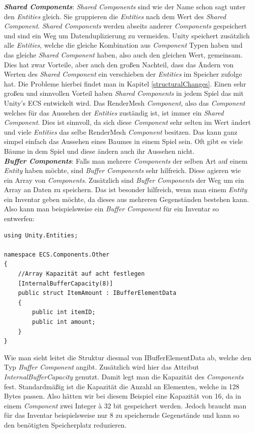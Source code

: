 \textbf{\textit{Shared Components}}: \textit{Shared Components} sind wie der Name schon sagt unter den \textit{Entities} gleich. Sie gruppieren die \textit{Entities} nach dem Wert des \textit{Shared Component}. \textit{Shared Components} werden abseits anderer \textit{Components} gespeichert und sind ein Weg um Datenduplizierung zu vermeiden. Unity speichert zusätzlich alle \textit{Entities}, welche die gleiche Kombination aus \textit{Component} Typen haben und das gleiche \textit{Shared Component} haben, also auch den gleichen Wert, gemeinsam. Dies hat zwar Vorteile, aber auch den großen Nachteil, dass das Ändern von Werten des \textit{Shared Component} ein verschieben der \textit{Entities} im Speicher zufolge hat. Die Probleme hierbei findet man in Kapitel \ref{structuralChanges}. Einen sehr großen und sinnvollen Vorteil haben \textit{Shared Components} in jedem Spiel das mit Unity's ECS entwickelt wird. Das RenderMesh \textit{Component}, also das \textit{Component} welches für das Aussehen der \textit{Entities} zuständig ist, ist immer ein \textit{Shared Component}. Dies ist sinnvoll, da sich diese \textit{Component} sehr selten im Wert ändert und viele \textit{Entities} das selbe RenderMesh \textit{Component} besitzen. Das kann ganz simpel einfach das Aussehen eines Baumes in einem Spiel sein. Oft gibt es viele Bäume in dem Spiel und diese ändern auch ihr Aussehen nicht.\\
\textbf{\textit{Buffer Components}}: Falls man mehrere \textit{Components} der selben Art auf einem \textit{Entity} haben möchte, sind \textit{Buffer Components} sehr hilfreich. Diese agieren wie ein Array von \textit{Components}. Zusätzlich sind \textit{Buffer Components} der Weg um ein Array an Daten zu speichern. Das ist besonder hilfreich, wenn man einem \textit{Entity} ein Inventar geben möchte, da dieses aus mehreren Gegenständen bestehen kann. Also kann man beispielsweise ein \textit{Buffer Component} für ein Inventar so entwerfen:
\begin{lstlisting}[style=code, caption={Buffer \textit{Component} Beispiel}]
using Unity.Entities;

namespace ECS.Components.Other
{
	//Array Kapazität auf acht festlegen
    [InternalBufferCapacity(8)]
    public struct ItemAmount : IBufferElementData
    {
        public int itemID;
        public int amount;
    }
}
\end{lstlisting}
Wie man sieht leitet die Struktur diesmal von IBufferElementData ab, welche den Typ \textit{Buffer Component} angibt. Zusätzlich wird hier das Attribut \textit{InternalBufferCapacity} genutzt. Damit legt man die Kapazität des \textit{Components} fest. Standardmäßig ist die Kapazität die Anzahl an Elementen, welche in 128 Bytes passen. Also hätten wir bei diesem Beispiel eine Kapazität von 16, da in einem \textit{Component} zwei Integer à 32 bit gespeichert werden. Jedoch braucht man für das Inventar beispielsweise nur 8 zu speichernde Gegenstände und kann so den benötigten Speicherplatz reduzieren.
